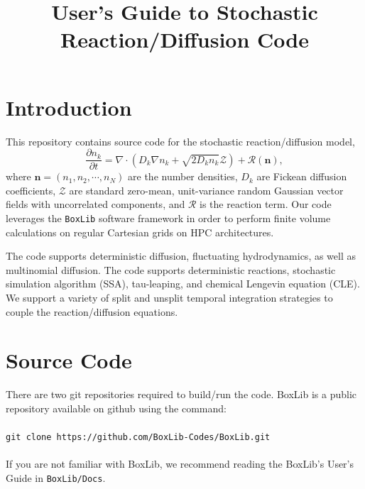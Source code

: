 \documentclass[final]{siamltex}
\newcommand{\nb}{\mathbf{n}}
\def\mRb {\bm{\mathcal{R}}}
\def\mZb {\bm{\mathcal{Z}}}
\begin{document}
\title{User's Guide to Stochastic Reaction/Diffusion Code}

\maketitle

\section{Introduction}
This repository contains source code for the stochastic reaction/diffusion model,
\begin{equation}
\frac{\partial n_k}{\partial t} = \nabla\cdot\left(D_k\nabla n_k + \sqrt{2D_kn_k}\mZb\right) + \mRb(\nb),
\end{equation}
where $\nb=(n_1,n_2,\cdots,n_N)$ are the number densities, $D_k$ are Fickean diffusion
coefficients, $\mZb$ are standard zero-mean, unit-variance random Gaussian 
vector fields with uncorrelated components, and $\mRb$ is the reaction term.
Our code leverages the {\tt BoxLib} software framework in order to perform
finite volume calculations on regular Cartesian grids on HPC architectures.

The code supports deterministic diffusion, fluctuating hydrodynamics,
as well as multinomial diffusion.  The code supports deterministic reactions, 
stochastic simulation algorithm (SSA),
tau-leaping, and chemical Lengevin equation (CLE).  We support a variety of
split and unsplit temporal integration strategies to couple the reaction/diffusion
equations.

\section{Source Code}
There are two git repositories required to build/run the code.  BoxLib is a public
repository available on github using the command:\\ \\
{\tt git clone https://github.com/BoxLib-Codes/BoxLib.git}\\ \\
If you are not familiar with BoxLib, we recommend reading the BoxLib's User's Guide
in {\tt BoxLib/Docs}.\\
\end{document}
